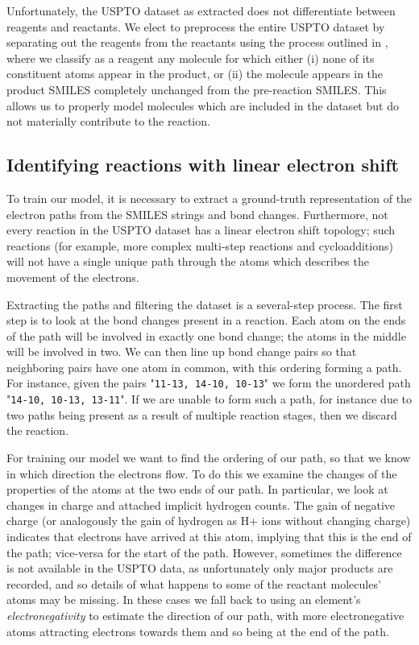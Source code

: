 Unfortunately, the USPTO dataset as extracted does not differentiate between reagents and reactants.
We elect to preprocess the entire USPTO dataset by separating out the reagents from the reactants using the process outlined in \citet{schwaller2017found}, where we classify as a reagent any molecule for which either 
(i) none of its constituent atoms appear in the product, or 
(ii) the molecule appears in the product SMILES completely unchanged from the pre-reaction SMILES.
This allows us to properly model molecules which are included in the dataset but do not materially contribute to the reaction.

\subsection{Identifying reactions with linear electron shift}

To train our model, it is necessary to extract a ground-truth representation of the electron paths from the SMILES strings and bond changes.
Furthermore, not every reaction in the USPTO dataset has a linear electron shift topology; 
such reactions (for example, more complex multi-step reactions and cycloadditions) will not have a single unique path through the atoms 
which describes the movement of the electrons.

Extracting the paths and filtering the dataset is a several-step process.
The first step is to look at the bond changes present in a reaction. 
Each atom on the ends of the path will be involved in exactly one bond change;
the atoms in the middle will be involved in two. 
We can then line up bond change pairs so that neighboring pairs have one atom in common,
 with this ordering forming a path.
For instance, given the pairs "\texttt{11-13, 14-10, 10-13}" we form the unordered path "\texttt{14-10, 10-13, 13-11}".
If we are unable to form such a path, for instance due to two paths being present as a result of multiple reaction stages, then we discard the reaction.

For training our model we want to find the ordering of our path, so that we know in which direction the electrons flow.
To do this we examine the changes of the properties of the atoms at the two ends of our path. 
In particular, we look at changes in charge and attached implicit hydrogen counts. 
The gain of negative charge (or analogously the gain of hydrogen as H+ ions without changing charge) indicates that electrons have arrived at this atom, 
implying that this is the end of the path; 
vice-versa for the start of the path.
However, sometimes the difference is not available in the USPTO data, as unfortunately only major products are recorded, and so details of what happens to some of the reactant molecules' atoms may be missing.
In these cases we fall back to using an element's {\em electronegativity} to estimate the direction of our path, with more electronegative atoms attracting electrons towards them and so being at the end of the path. 

